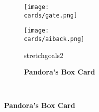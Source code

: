 \vspace*{-1em}
\begin{figure}[H]
  \centering
  \hfill
  \begin{subfigure}[c]{0.23\linewidth}
    \centering
    \texttt{[image: \\cards/gate.png]}
    \caption{\textbf{}}
  \end{subfigure}
  \hfill
  \begin{subfigure}[c]{0.23\linewidth}
    \centering
    \texttt{[image: \\cards/aiback.png]}
    \caption{\textbf{}}
  \end{subfigure}
  \hfill
  \begin{subfigure}[c]{0.23\linewidth}
    \begin{expansionmini}{stretchgoals2}
      \centering
      \caption{\textbf{Pandora's Box Card}}
    \end{expansionmini}
  \end{subfigure}
  \hfill
  ~
\end{figure}



\clearpage





